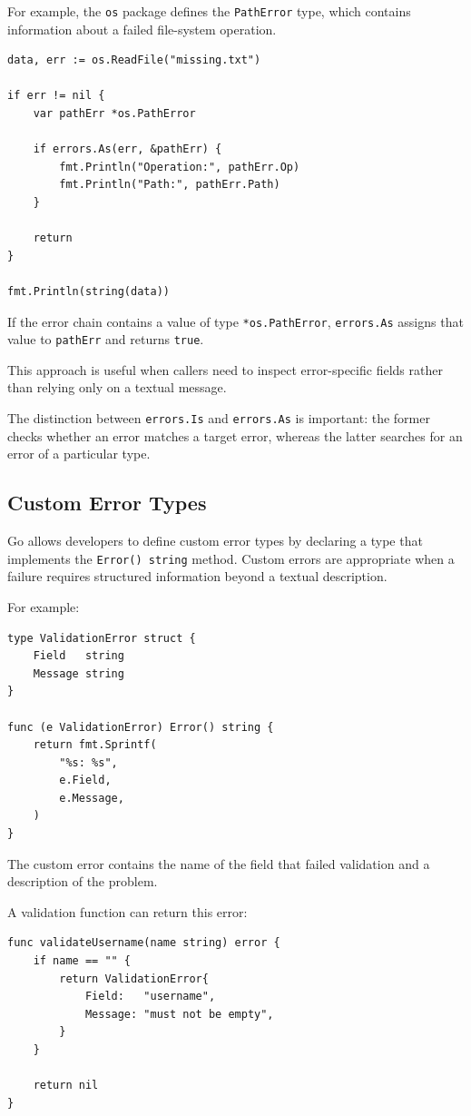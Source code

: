 For example, the \texttt{os} package defines the \texttt{PathError} type, which contains information about a failed file-system operation.

\begin{lstlisting}
data, err := os.ReadFile("missing.txt")

if err != nil {
    var pathErr *os.PathError

    if errors.As(err, &pathErr) {
        fmt.Println("Operation:", pathErr.Op)
        fmt.Println("Path:", pathErr.Path)
    }

    return
}

fmt.Println(string(data))
\end{lstlisting}

If the error chain contains a value of type \texttt{*os.PathError}, \texttt{errors.As} assigns that value to \texttt{pathErr} and returns \texttt{true}.

This approach is useful when callers need to inspect error-specific fields rather than relying only on a textual message.

The distinction between \texttt{errors.Is} and \texttt{errors.As} is important: the former checks whether an error matches a target error, whereas the latter searches for an error of a particular type.

\subsection{Custom Error Types}

Go allows developers to define custom error types by declaring a type that implements the \texttt{Error() string} method. Custom errors are appropriate when a failure requires structured information beyond a textual description.

For example:

\begin{lstlisting}
type ValidationError struct {
    Field   string
    Message string
}

func (e ValidationError) Error() string {
    return fmt.Sprintf(
        "%s: %s",
        e.Field,
        e.Message,
    )
}
\end{lstlisting}

The custom error contains the name of the field that failed validation and a description of the problem.

A validation function can return this error:

\begin{lstlisting}
func validateUsername(name string) error {
    if name == "" {
        return ValidationError{
            Field:   "username",
            Message: "must not be empty",
        }
    }

    return nil
}
\end{lstlisting}

